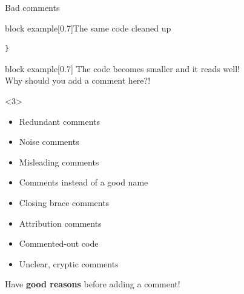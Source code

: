 \begin{frame}[fragile]{Bad comments}
\begin{overlayarea}{\textwidth}{\textheight}
\begin{onlyenv}
\begin{varblock}{block example}[0.7\textwidth]{The same code cleaned up}
\begin{lstlisting}[style=MyCpp]
                    }
                \end{lstlisting}
            \end{varblock}
            \vspace{-2mm}
            \begin{varblock}{block example}[0.7\textwidth]{}
                The code becomes smaller and it reads well!\\
                Why should you add a comment here?!
            \end{varblock}
        \end{onlyenv}
        \begin{onlyenv}<3>
            \vspace{3mm}
            \begin{itemize}
                \item Redundant comments               \hfill{}
                \item Noise comments                   \hfill{}
                \item Misleading comments              \hfill{}
                \item Comments instead of a good name  \hfill{}
                \item Closing brace comments           \hfill{}
                \item Attribution comments             \hfill{}
                \item Commented-out code               \hfill{}
                \item Unclear, cryptic comments        \hfill{}
            \end{itemize}
            \begin{center}
                \large
                Have \textbf{good reasons} before adding a comment!
            \end{center}
        \end{onlyenv}
    \end{overlayarea}
\end{frame}
